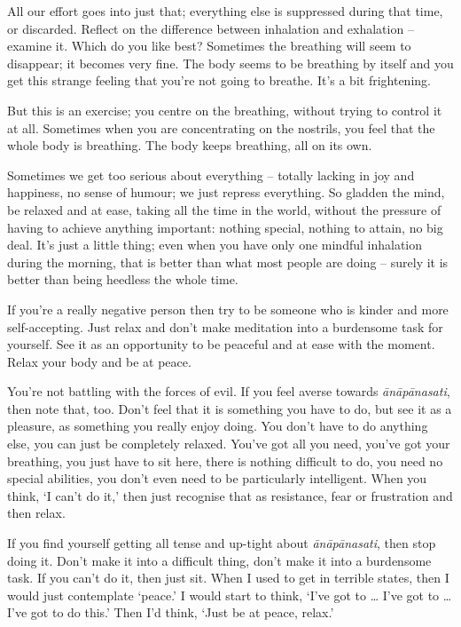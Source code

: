 All our effort goes into just that; everything else is suppressed during that time, or discarded. Reflect on the difference between inhalation and exhalation -- examine it. Which do you like best? Sometimes the breathing will seem to disappear; it becomes very fine. The body seems to be breathing by itself and you get this strange feeling that you're not going to breathe. It's a bit frightening.

But this is an exercise; you centre on the breathing, without trying to control it at all. Sometimes when you are concentrating on the nostrils, you feel that the whole body is breathing. The body keeps breathing, all on its own.

Sometimes we get too serious about everything -- totally lacking in joy and happiness, no sense of humour; we just repress everything. So gladden the mind, be relaxed and at ease, taking all the time in the world, without the pressure of having to achieve anything important: nothing special, nothing to attain, no big deal. It's just a little thing; even when you have only one mindful inhalation during the morning, that is better than what most people are doing -- surely it is better than being heedless the whole time.

If you're a really negative person then try to be someone who is kinder and more self-accepting. Just relax and don't make meditation into a burdensome task for yourself. See it as an opportunity to be peaceful and at ease with the moment. Relax your body and be at peace.

You're not battling with the forces of evil. If you feel averse towards \textit{\=an\=ap\=anasati}, then note that, too. Don't feel that it is something you have to do, but see it as a pleasure, as something you really enjoy doing. You don't have to do anything else, you can just be completely relaxed. You've got all you need, you've got your breathing, you just have to sit here, there is nothing difficult to do, you need no special abilities, you don't even need to be particularly intelligent. When you think, `I can't do it,' then just recognise that as resistance, fear or frustration and then relax.

If you find yourself getting all tense and up-tight about \textit{\=an\=ap\=anasati}, then stop doing it. Don't make it into a difficult thing, don't make it into a burdensome task. If you can't do it, then just sit. When I used to get in terrible states, then I would just contemplate `peace.' I would start to think, `I've got to \ldots{} I've got to \ldots{} I've got to do this.' Then I'd think, `Just be at peace, relax.'

